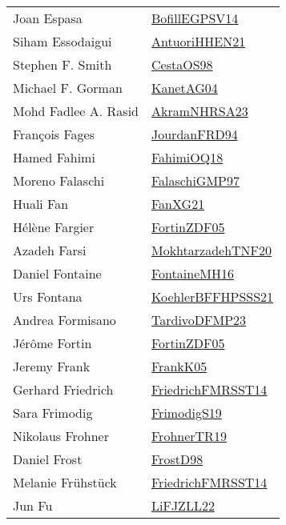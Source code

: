 {\begin{longtable}{p{4cm}p{20cm}}
Joan Espasa & \href{papers/BofillEGPSV14.pdf}{BofillEGPSV14}\cite{BofillEGPSV14} \\
Siham Essodaigui & \href{papers/AntuoriHHEN21.pdf}{AntuoriHHEN21}\cite{AntuoriHHEN21} \\
Stephen F. Smith & \href{papers/CestaOS98.pdf}{CestaOS98}\cite{CestaOS98} \\
Michael F. Gorman & \href{}{KanetAG04}\cite{KanetAG04} \\
Mohd Fadlee A. Rasid & \href{articles/AkramNHRSA23.pdf}{AkramNHRSA23}\cite{AkramNHRSA23} \\
Fran{\c{c}}ois Fages & \href{}{JourdanFRD94}\cite{JourdanFRD94} \\
Hamed Fahimi & \href{articles/FahimiOQ18.pdf}{FahimiOQ18}\cite{FahimiOQ18} \\
Moreno Falaschi & \href{articles/FalaschiGMP97.pdf}{FalaschiGMP97}\cite{FalaschiGMP97} \\
Huali Fan & \href{articles/FanXG21.pdf}{FanXG21}\cite{FanXG21} \\
H{\'{e}}l{\`{e}}ne Fargier & \href{papers/FortinZDF05.pdf}{FortinZDF05}\cite{FortinZDF05} \\
Azadeh Farsi & \href{}{MokhtarzadehTNF20}\cite{MokhtarzadehTNF20} \\
Daniel Fontaine & \href{papers/FontaineMH16.pdf}{FontaineMH16}\cite{FontaineMH16} \\
Urs Fontana & \href{articles/KoehlerBFFHPSSS21.pdf}{KoehlerBFFHPSSS21}\cite{KoehlerBFFHPSSS21} \\
Andrea Formisano & \href{papers/TardivoDFMP23.pdf}{TardivoDFMP23}\cite{TardivoDFMP23} \\
J{\'{e}}r{\^{o}}me Fortin & \href{papers/FortinZDF05.pdf}{FortinZDF05}\cite{FortinZDF05} \\
Jeremy Frank & \href{papers/FrankK05.pdf}{FrankK05}\cite{FrankK05} \\
Gerhard Friedrich & \href{}{FriedrichFMRSST14}\cite{FriedrichFMRSST14} \\
Sara Frimodig & \href{papers/FrimodigS19.pdf}{FrimodigS19}\cite{FrimodigS19} \\
Nikolaus Frohner & \href{papers/FrohnerTR19.pdf}{FrohnerTR19}\cite{FrohnerTR19} \\
Daniel Frost & \href{papers/FrostD98.pdf}{FrostD98}\cite{FrostD98} \\
Melanie Fr{\"{u}}hst{\"{u}}ck & \href{}{FriedrichFMRSST14}\cite{FriedrichFMRSST14} \\
Jun Fu & \href{papers/LiFJZLL22.pdf}{LiFJZLL22}\cite{LiFJZLL22} \\

\end{longtable}}
